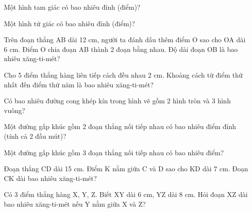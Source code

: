 \begin{ex}
Một hình tam giác có bao nhiêu đỉnh (điểm)?
\end{ex}

\begin{ex}
Một hình tứ giác có bao nhiêu đỉnh (điểm)?
\end{ex}

\begin{ex}
Trên đoạn thẳng AB dài 12 cm, người ta đánh dấu thêm điểm O sao cho OA dài 6 cm. Điểm O chia đoạn AB thành 2 đoạn bằng nhau. Độ dài đoạn OB là bao nhiêu xăng-ti-mét?
\end{ex}

\begin{ex}
Cho 5 điểm thẳng hàng liên tiếp cách đều nhau 2 cm. Khoảng cách từ điểm thứ nhất đến điểm thứ năm là bao nhiêu xăng-ti-mét?
\end{ex}

\begin{ex}
Có bao nhiêu đường cong khép kín trong hình vẽ gồm 2 hình tròn và 3 hình vuông?
\end{ex}

\begin{ex}
Một đường gấp khúc gồm 2 đoạn thẳng nối tiếp nhau có bao nhiêu điểm đỉnh (tính cả 2 đầu mút)?
\end{ex}

\begin{ex}
Một đường gấp khúc gồm 3 đoạn thẳng nối tiếp nhau có bao nhiêu điểm?
\end{ex}

\begin{ex}
Đoạn thẳng CD dài 15 cm. Điểm K nằm giữa C và D sao cho KD dài 7 cm. Đoạn CK dài bao nhiêu xăng-ti-mét?
\end{ex}

\begin{ex}
Có 3 điểm thẳng hàng X, Y, Z. Biết XY dài 6 cm, YZ dài 8 cm. Hỏi đoạn XZ dài bao nhiêu xăng-ti-mét nếu Y nằm giữa X và Z?
\end{ex}

